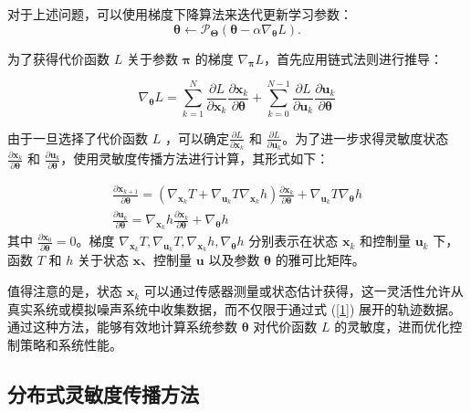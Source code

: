 \documentclass[lang=chs, degree=master, blindreview=true, winfonts=true]{yanputhesis}
\begin{document}
对于上述问题，可以使用梯度下降算法来迭代更新学习参数：
\begin{equation}
    \bm \theta\leftarrow\mathcal{P}_{\bm \Theta}(\bm \theta-\alpha\nabla_{\bm \theta}L).
\end{equation}

为了获得代价函数 $L$ 关于参数 $\bm \pi$ 的梯度 $\nabla_{\bm \pi} L$，首先应用链式法则进行推导：

\begin{equation}
    \nabla_{\bm \theta} L = \sum_{k=1}^{N} \frac{\partial L}{\partial \bm x_k} \frac{\partial \bm x_k}{\partial \bm \theta} + \sum_{k=0}^{N-1} \frac{\partial L}{\partial \bm u_k} \frac{\partial \bm u_k}{\partial \bm \theta}
\end{equation}

由于一旦选择了代价函数 
$L$ ，可以确定$\frac{\partial L}{\partial \bm x_k}$ 和 $\frac{\partial L}{\partial \bm u_k}$。为了进一步求得灵敏度状态 $\frac{\partial \bm x_k}{\partial \bm \theta}$ 和 $\frac{\partial \bm u_k}{\partial \bm \theta}$，使用灵敏度传播方法进行计算，其形式如下：

\begin{equation}
	\begin{gathered}
		\frac{\partial \bm x_{k+1}}{\partial \bm \theta} = ({\nabla}_{\bm x_k}  T + {\nabla}_{\bm u_k} T {\nabla}_{\bm x_k} h) \frac{\partial \bm x_k}{\partial \bm \theta} + {\nabla}_{\bm u_k} T {\nabla_{\bm \theta}} h\\
		\frac{\partial \bm u_k}{\partial \bm \theta} = {\nabla}_{\bm x_k} h \frac{\partial \bm x_k}{\partial \bm \theta} + {\nabla_{\bm \theta}} h
	\end{gathered}
\end{equation}
其中 \( \frac{\partial \bm x_0}{\partial \bm \theta} = 0 \)。梯度
\( {\nabla}_{\bm x_k} T, {\nabla}_{\bm u_k} T, {\nabla}_{\bm x_k} h, {\nabla_{\bm \theta}} h \) 分别表示在状态 $\bm x_k$ 和控制量 $\bm u_k$ 下，函数 $T$ 和 $h$ 关于状态 $\bm x$、控制量 $\bm u$ 以及参数 $\bm \theta$ 的雅可比矩阵。

值得注意的是，状态 $\bm x_k$ 可以通过传感器测量或状态估计获得，这一灵活性允许从真实系统或模拟噪声系统中收集数据，而不仅限于通过式 (\ref{1}) 展开的轨迹数据。
通过这种方法，能够有效地计算系统参数 $\bm \theta$ 对代价函数 $L$ 的灵敏度，进而优化控制策略和系统性能。

\subsection{分布式灵敏度传播方法}
\end{document}
